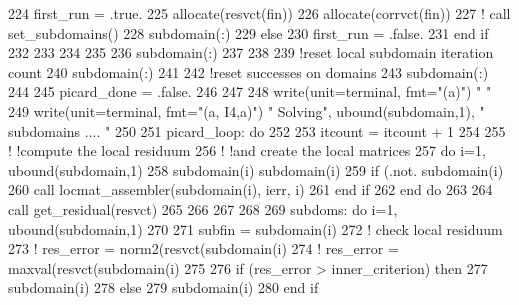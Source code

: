 \begin{DoxyCode}
224           first\_run = .true.
225           \textcolor{keyword}{allocate}(resvct(fin))
226           \textcolor{keyword}{allocate}(corrvct(fin))          
227 \textcolor{comment}{!           call set\_subdomains()}
228           subdomain(:)%
229         \textcolor{keywordflow}{else}
230           first\_run = .false.
231 \textcolor{keywordflow}{        end if}
232         
233         
234         
235 
236         subdomain(:)%
237 
238                 
239         \textcolor{comment}{!reset local subdomain iteration count}
240         subdomain(:)%
241 
242         \textcolor{comment}{!reset successes on domains}
243         subdomain(:)%
244         
245         picard\_done = .false.
246         
247 
248         \textcolor{keyword}{write}(unit=terminal, fmt=\textcolor{stringliteral}{"(a)"}) \textcolor{stringliteral}{"  "}
249         \textcolor{keyword}{write}(unit=terminal, fmt=\textcolor{stringliteral}{"(a, I4,a)"}) \textcolor{stringliteral}{" Solving"}, ubound(subdomain,1),  \textcolor{stringliteral}{" subdomains .... "}
250 
251         picard\_loop: \textcolor{keywordflow}{do}
252         
253           itcount = itcount + 1
254 
255   \textcolor{comment}{!       !compute the local residuum}
256   \textcolor{comment}{!       !and create the local matrices}
257           \textcolor{keywordflow}{do} i=1, ubound(subdomain,1)
258             subdomain(i)%
      subdomain(i)%
259             \textcolor{keywordflow}{if} (.not. subdomain(i)%
260               \textcolor{keyword}{call }locmat_assembler(subdomain(i), ierr, i)
261 \textcolor{keywordflow}{            end if}
262 \textcolor{keywordflow}{          end do}
263                   
264           \textcolor{keyword}{call }get_residual(resvct)
265 
266 
267          
268           
269           subdoms:  \textcolor{keywordflow}{do} i=1, ubound(subdomain,1)
270 
271             subfin = subdomain(i)%
272                 \textcolor{comment}{! check local residuum}
273 \textcolor{comment}{!           res\_error = norm2(resvct(subdomain(i)%
274     \textcolor{comment}{!                   res\_error = maxval(resvct(subdomain(i)%
275 
276             \textcolor{keywordflow}{if} (res\_error > inner_criterion) \textcolor{keywordflow}{then}
277               subdomain(i)%
278             \textcolor{keywordflow}{else}
279               subdomain(i)%
280 \textcolor{keywordflow}{            end if}
}}
\end{DoxyCode}
